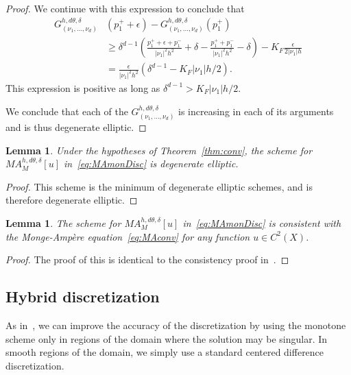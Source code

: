 \documentclass{amsart}
\theoremstyle{lemma}
\newtheorem{lemma}[theorem]{Lemma}
\theoremstyle{remark}
\begin{document}
\begin{proof}
We continue with this expression to conclude that
\begin{align*}
G_{(\nu_1,\ldots,\nu_d)}^{h,d\theta,\delta}&(p_1^++\epsilon)-G_{(\nu_1,\ldots,\nu_d)}^{h,d\theta,\delta}(p_1^+) \\
  &\geq \delta^{d-1}\left(\frac{p_1^++\epsilon+p_1^-}{{\left\vert{\nu_1}\right\vert}^2h^2} + \delta - \frac{p_1^++p_1^-}{{\left\vert{\nu_1}\right\vert}^2h^2}-\delta\right)-K_F\frac{\epsilon}{2{\left\vert{\nu_1}\right\vert}h}\\
  &= \frac{\epsilon}{{\left\vert{\nu_1}\right\vert}^2h^2}(\delta^{d-1}-K_F{\left\vert{\nu_1}\right\vert}h/2).
\end{align*}
This expression is positive as long as $\delta^{d-1}>K_F{\left\vert{\nu_1}\right\vert}h/2$.

We conclude that each of the $G_{(\nu_1,\ldots,\nu_d)}^{h,d\theta,\delta}$ is increasing in each of its arguments and is thus degenerate elliptic.
\end{proof}

\begin{lemma}\label{lem:deg}
Under the hypotheses of Theorem~\ref{thm:conv}, the scheme for $MA^{h,d\theta,\delta}_M[u]$ in~\eqref{eq:MAmonDisc} is degenerate elliptic.
\end{lemma}
\begin{proof}
This scheme is the minimum of degenerate elliptic schemes, and is therefore degenerate elliptic.
\end{proof}

\begin{lemma}\label{lem:consistency}
The scheme for $MA^{h,d\theta,\delta}_M[u]$ in~\eqref{eq:MAmonDisc} is consistent with the {{Monge-Amp\`ere}\xspace} equation~\eqref{eq:MAconv} for any function $u\in C^2(X)$.
\end{lemma}
\begin{proof}
The proof of this is identical to the consistency proof in~\cite[Lemma~6]{FOTheory}.
\end{proof}

\subsection{Hybrid discretization}\label{sec:discHybrid}
As in~\cite{FONum}, we can improve the accuracy of the discretization by using the monotone scheme only in regions of the domain where the solution may be singular.  In smooth regions of the domain, we simply use a standard centered difference discretization.
\end{document}
